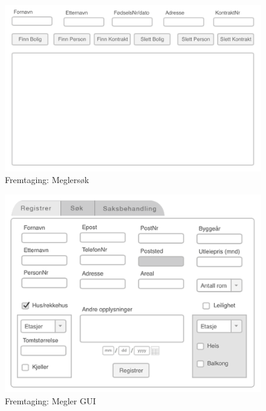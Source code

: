 \begin{figure}[ht]
 \includegraphics[width=\textwidth,height=\textheight,keepaspectratio]{./img/appendix/gui_forslag/rev_1/Meglersok.png}
 \caption{Fremtaging: Meglersøk}
 \label{fig:DEV:meglersok}
\end{figure}


\begin{figure}[ht]
 \includegraphics[width=\textwidth,height=\textheight,keepaspectratio]{./img/appendix/gui_forslag/rev_1/MeglerGUI.png}
 \caption{Fremtaging: Megler GUI}
 \label{fig:DEV:meglerGUI}
\end{figure}

